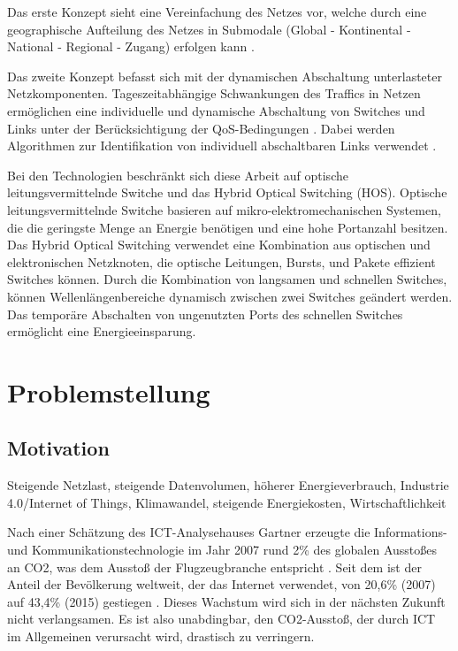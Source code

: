\documentclass[12pt,titlepage]{article}
\begin{document}
Das erste Konzept sieht eine Vereinfachung des Netzes vor, welche durch eine geographische Aufteilung des Netzes in Submodale (Global - Kontinental - National - Regional - Zugang) erfolgen kann \cite{aleksic2014}.

Das zweite Konzept befasst sich mit der dynamischen Abschaltung unterlasteter Netzkomponenten. Tageszeitabhängige Schwankungen des Traffics in Netzen ermöglichen eine individuelle und dynamische Abschaltung von Switches und Links unter der Be\-rück\-sich\-ti\-gung der QoS-Bedingungen \cite{aleksic2013}. Dabei werden Algorithmen zur Identifikation von individuell abschaltbaren Links verwendet \cite{fisher}.

Bei den Technologien beschränkt sich diese Arbeit auf optische leitungsvermittelnde Switche und das Hybrid Optical Switching (HOS). Optische leitungsvermittelnde Switche basieren auf mikro-elektromechanischen Systemen, die die geringste Menge an Energie benötigen und eine hohe Portanzahl besitzen. Das Hybrid Optical Switching verwendet eine Kombination aus optischen und elektronischen Netzknoten, die optische Leitungen, Bursts, und Pakete effizient Switches können. Durch die Kombination von langsamen und schnellen Switches, können Wellenlängenbereiche dynamisch zwischen zwei Switches geändert werden. Das temporäre Abschalten von ungenutzten Ports des schnellen Switches ermöglicht eine Energieeinsparung.  \cite{aleksic2013}

\section{Problemstellung}
\subsection{Motivation}
Steigende Netzlast, steigende Datenvolumen, höherer Energieverbrauch, Industrie 4.0/Internet of Things, Klimawandel, steigende Energiekosten, Wirtschaftlichkeit

Nach einer Schätzung des ICT-Analysehauses Gartner erzeugte die Informations- und Kommunikationstechnologie im Jahr 2007 rund 2\% des globalen Ausstoßes an CO2, was dem Ausstoß der Flugzeugbranche entspricht \cite{gartner}. Seit dem ist der Anteil der Bevölkerung weltweit, der das Internet verwendet, von 20,6\% (2007) auf 43,4\% (2015) gestiegen \cite{itu}. Dieses Wachstum wird sich in der nächsten Zukunft nicht verlangsamen. Es ist also unabdingbar, den CO2-Ausstoß, der durch ICT im Allgemeinen verursacht wird, drastisch zu verringern.
\end{document}
